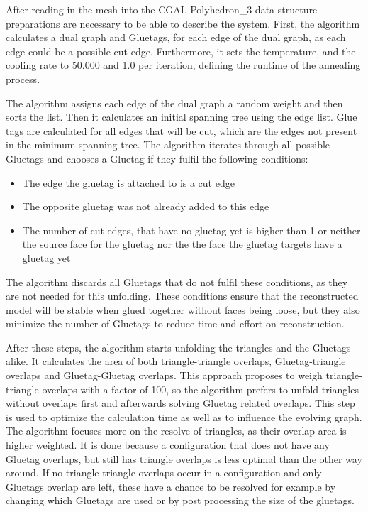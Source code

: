 \documentclass[draft,final]{vutinfth} %
\begin{document}
After reading in the mesh into the CGAL Polyhedron\_3 data structure preparations are necessary to be able to describe the system. First, the algorithm calculates a dual graph and Gluetags, for each edge of the dual graph, as each edge could be a possible cut edge. Furthermore, it sets the temperature, and the cooling rate to 50.000 and 1.0 per iteration, defining the runtime of the annealing process.

The algorithm assigns each edge of the dual graph a random weight and then sorts the list. Then it calculates an initial spanning tree using the edge list. Glue tags are calculated for all edges that will be cut, which are the edges not present in the minimum spanning tree. The algorithm iterates through all possible Gluetags and chooses a Gluetag if they fulfil the following conditions:

\begin{itemize}
	\item The edge the gluetag is attached to is a cut edge
	\item The opposite gluetag was not already added to this edge
	\item The number of cut edges, that have no gluetag yet is higher than 1 or neither the source face for the gluetag nor the the face the gluetag targets have a gluetag yet
\end{itemize}

The algorithm discards all Gluetags that do not fulfil these conditions, as they are not needed for this unfolding. These conditions ensure that the reconstructed model will be stable when glued together without faces being loose, but they also minimize the number of Gluetags to reduce time and effort on reconstruction.

After these steps, the algorithm starts unfolding the triangles and the Gluetags alike. It calculates the area of both triangle-triangle overlaps, Gluetag-triangle overlaps and Gluetag-Gluetag overlaps. This approach proposes to weigh triangle-triangle overlaps with a factor of 100, so the algorithm prefers to unfold triangles without overlaps first and afterwards solving Gluetag related overlaps. This step is used to optimize the calculation time as well as to influence the evolving graph. The algorithm focuses more on the resolve of triangles, as their overlap area is higher weighted. It is done because a configuration that does not have any Gluetag overlaps, but still has triangle overlaps is less optimal than the other way around. If no triangle-triangle overlaps occur in a configuration and only Gluetags overlap are left, these have a chance to be resolved for example by changing which Gluetags are used or by post processing the size of the gluetags.
\end{document}
